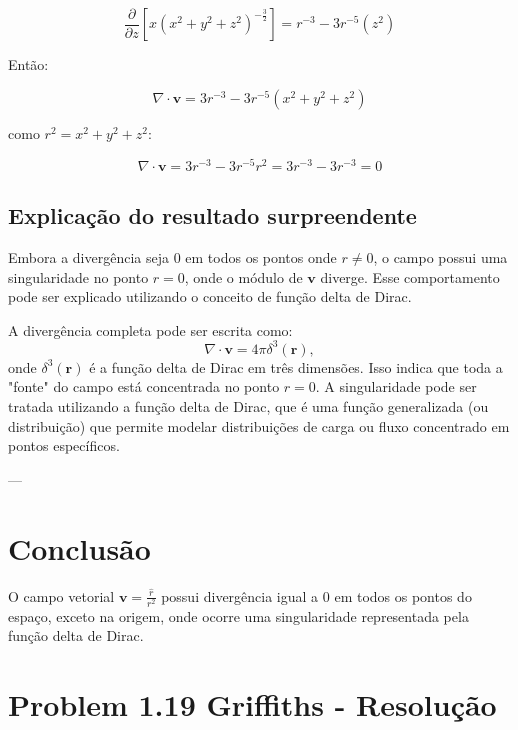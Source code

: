 \documentclass[a4paper,12pt]{article}
\begin{document}
\begin{equation}
    \frac{\partial}{\partial z}\left[x(x^2+y^2+z^2)^{-\frac{3}{2}}\right] = r^{-3} - 3r^{-5}\left(z^2\right)
\end{equation}

Ent\~ao:

\begin{equation}
    \nabla \cdot \mathbf{v} = 3r^{-3} -3r^{-5}\left(x^2+y^2+z^2\right)
\end{equation}

como $r^2 = x^2 + y^2 + z^2$:

\begin{equation}
    \nabla \cdot \mathbf{v} = 3r^{-3} - 3r^{-5}r^2 = 3r^{-3} - 3r^{-3} = 0 
\end{equation}

\subsection*{Explicação do resultado surpreendente}

Embora a divergência seja \( 0 \) em todos os pontos onde \( r \neq 0 \), o campo possui uma singularidade no 
ponto \( r = 0 \), onde o módulo de \( \mathbf{v} \) diverge. Esse comportamento pode ser explicado utilizando 
o conceito de função delta de Dirac. 

A divergência completa pode ser escrita como:
\begin{equation}
\nabla \cdot \mathbf{v} = 4\pi \delta^3(\mathbf{r}),
\end{equation}
onde \( \delta^3(\mathbf{r}) \) é a função delta de Dirac em três dimensões. Isso indica que toda a "fonte" 
do campo está concentrada no ponto \( r = 0 \). A singularidade pode ser tratada utilizando a função delta de Dirac, 
que é uma função generalizada (ou distribuição) que permite modelar distribuições de carga ou fluxo concentrado em 
pontos específicos.

---

\section*{Conclusão}

O campo vetorial \( \mathbf{v} = \frac{\hat{r}}{r^2} \) possui divergência igual a \( 0 \) em todos os pontos do espaço, 
exceto na origem, onde ocorre uma singularidade representada pela função delta de Dirac.

\newpage
\section*{Problem 1.19 Griffiths - Resolu\c{c}\~ao}
\end{document}
